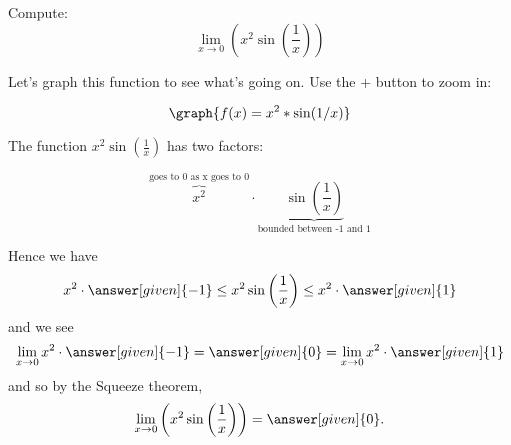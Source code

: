 \documentclass{ximera}
\begin{document}
\begin{example}
  Compute:
  \[
  \displaystyle\lim_{x\to 0} \left(x^2\sin\left(\frac{1}{x}\right)\right)
  \]
  \begin{explanation}
    Let's graph this function to see what's going on. Use the + button to zoom in:
    
    
          
  \[
   \graph{f(x)=x^2*\sin(1/x)}
  \]
 
 The function $x^2\sin\left(\frac{1}{x}\right)$ has two factors:

\[
\overbrace{x^2}^{\text{goes to 0 as x goes to 0}} \cdot \underbrace{\sin\left(\frac{1}{x}\right)}_{\text{bounded between -1 and 1}}
\]
   
   Hence we have
    \[
    x^2 \cdot \answer[given]{-1} \le x^2\sin\left(\frac{1}{x}\right) \le x^2 \cdot \answer[given]{1}
    \]
    and we see
    \[
    \lim_{x\to 0} x^2 \cdot \answer[given]{-1} = \answer[given]{0} = \lim_{x\to 0} x^2 \cdot \answer[given]{1}
    \]
    and so by the Squeeze theorem,
    \[
    \lim_{x\to
      0}\left(x^2\sin\left(\frac{1}{x}\right)\right)=\answer[given]{0}.
    \]
  \end{explanation}
\end{example}
\end{document}
